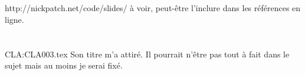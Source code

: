 \section{}

\section{}
http://nickpatch.net/code/slides/ à voir, peut-être l'inclure dans les références en ligne.

\section{}

\section{}

\section{}

\section{}
{CLA:CLA003.tex}
Son titre m'a attiré. Il pourrait n'être pas tout à fait dans le sujet mais au moins je serai fixé.